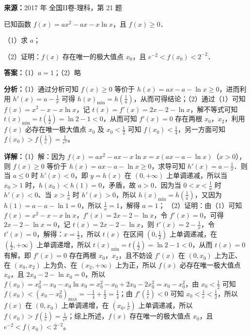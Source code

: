 \begin{question}[points=12]
\textbf{来源：}2017 年 全国II卷-理科，第 21 题\par
已知函数 $f(x)=ax^2-ax-x\ln x$，且 $f(x)\ge0$．

（1）求 $a$；

（2）证明：$f(x)$ 存在唯一的极大值点 $x_0$，且 $e^{-2}<f(x_0)<2^{-2}$．
\begin{solution}
\textbf{答案：}（1）$a=1$；（2）略

\textbf{分析：}（1）通过分析可知 $f(x)\ge0$ 等价于 $h(x)=ax-a-\ln x\ge0$，进而利用 $h'(x)=a-\frac{1}{x}$ 可得 $h(x)_{\min}=h(\frac{1}{a})$，从而可得结论；（2）通过（1）可知 $f(x)=x^2-x-x\ln x$，记 $t(x)=f'(x)=2x-2-\ln x$，解不等式可知 $t(x)_{\min}=t(\frac{1}{2})=\ln2-1<0$，从而可知 $f'(x)=0$ 存在两根 $x_0$，$x_2$，利用 $f(x)$ 必存在唯一极大值点 $x_0$ 及 $x_0<\frac{1}{2}$ 可知 $f(x_0)<\frac{1}{4}$，另一方面可知 $f(x_0)>f(\frac{1}{e})=\frac{1}{e^2}$。

\textbf{详解：}（1）解：因为 $f(x)=ax^2-ax-x\ln x=x(ax-a-\ln x)$（$x>0$），则 $f(x)\ge0$ 等价于 $h(x)=ax-a-\ln x\ge0$，求导可知 $h'(x)=a-\frac{1}{x}$．则当 $a\le0$ 时 $h'(x)<0$，即 $y=h(x)$ 在 $(0,+\infty)$ 上单调递减，所以当 $x_0>1$ 时，$h(x_0)<h(1)=0$，矛盾，故 $a>0$．因为当 $0<x<\frac{1}{a}$ 时 $h'(x)<0$、当 $x>\frac{1}{a}$ 时 $h'(x)>0$，所以 $h(x)_{\min}=h(\frac{1}{a})$，又因为 $h(1)=a-a-\ln1=0$，所以 $\frac{1}{a}=1$，解得 $a=1$；
（2）证明：由（1）可知 $f(x)=x^2-x-x\ln x$，$f'(x)=2x-2-\ln x$，令 $f'(x)=0$，可得 $2x-2-\ln x=0$，记 $t(x)=2x-2-\ln x$，则 $t'(x)=2-\frac{1}{x}$，令 $t'(x)=0$，解得：$x=\frac{1}{2}$，所以 $t(x)$ 在区间 $(0,\frac{1}{2})$ 上单调递减，在 $(\frac{1}{2},+\infty)$ 上单调递增，所以 $t(x)_{\min}=t(\frac{1}{2})=\ln2-1<0$，从而 $t(x)=0$ 有解，即 $f'(x)=0$ 存在两根 $x_0$，$x_2$，且不妨设 $f'(x)$ 在 $(0,x_0)$ 上为正、在 $(x_0,x_2)$ 上为负、在 $(x_2,+\infty)$ 上为正，所以 $f(x)$ 必存在唯一极大值点 $x_0$，且 $2x_0-2-\ln x_0=0$，所以 $f(x_0)=x_0^2-x_0-x_0\ln x_0=x_0^2-x_0+2x_0-2x_0^2=x_0-x_0^2$，由 $x_0<\frac{1}{2}$ 可知 $f(x_0)<(x_0-x_0^2)_{\max}=-\frac{1}{4}+\frac{1}{2}=\frac{1}{4}$；由 $f'(\frac{1}{e})<0$ 可知 $x_0<\frac{1}{e}<\frac{1}{2}$，所以 $f(x)$ 在 $(0,x_0)$ 上单调递增，在 $(x_0,\frac{1}{e})$ 上单调递减，所以 $f(x_0)>f(\frac{1}{e})=\frac{1}{e^2}$；综上所述，$f(x)$ 存在唯一的极大值点 $x_0$，且 $e^{-2}<f(x_0)<2^{-2}$。
\end{solution}
\end{question}

